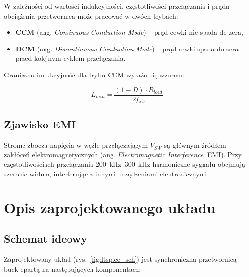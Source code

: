 \documentclass[12pt,a4paper]{article}
\begin{document}
W zależności od wartości indukcyjności, częstotliwości przełączania i prądu obciążenia
przetwornica może pracować w dwóch trybach:

\begin{itemize}
    \item \textbf{CCM} (ang. \textit{Continuous Conduction Mode}) -- prąd cewki
          nie spada do zera,
    \item \textbf{DCM} (ang. \textit{Discontinuous Conduction Mode}) -- prąd cewki
          spada do zera przed kolejnym cyklem przełączania.
\end{itemize}

Graniczna indukcyjność dla trybu CCM wyraża się wzorem:

\begin{equation}
    L_{min} = \frac{(1-D) \cdot R_{load}}{2 f_{sw}}
    \label{eq:lmin}
\end{equation}

\subsection{Zjawisko EMI}

Strome zbocza napięcia w węźle przełączającym $V_{SW}$ są głównym źródłem
zakłóceń elektromagnetycznych (ang. \textit{Electromagnetic Interference}, EMI).
Przy częstotliwościach przełączania \SIrange{200}{300}{kHz} harmoniczne sygnału
obejmują szerokie widmo, interferując z innymi urządzeniami elektronicznymi.

\section{Opis zaprojektowanego układu}

\subsection{Schemat ideowy}

Zaprojektowany układ (rys.~\ref{fig:ltspice_sch}) jest synchroniczną przetwornicą buck
opartą na następujących komponentach:
\end{document}
